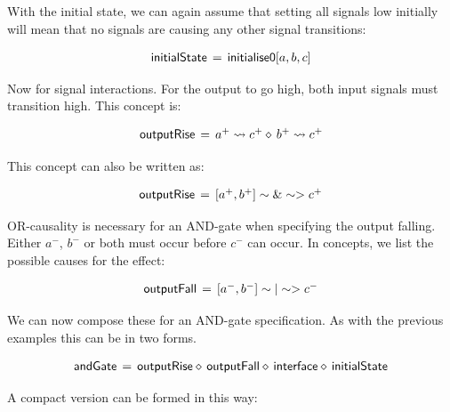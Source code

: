 \documentclass[british, journal]{IEEEtran}
\begin{document}
With the initial state, we can again assume that setting all signals low initially will mean 
that no signals are causing any other signal transitions:

\[
\begin{array}{lcl}
\mathsf{initialState}&\hspace{-2mm}=&\hspace{-2mm}\mathsf{initialise0} [a, b, c]
\end{array}
\]

Now for signal interactions. For the output to go high, both input signals must
transition high. This concept is: 

\[
\begin{array}{lcl}
\mathsf{outputRise}&\hspace{-2mm}=&\hspace{-2mm}a^{+} \rightsquigarrow c^{+} \diamond\, b^{+} \rightsquigarrow c^{+}
\end{array}
\]

This concept can also be written as:

\[
\begin{array}{lcl}
\mathsf{outputRise}&\hspace{-2mm}=&\hspace{-2mm}[a^{+}, b^{+}] \sim\&\sim> c^{+} 
\end{array}
\]

OR-causality is necessary for an AND-gate when specifying the output falling. Either $a^{-}$,
$b^{-}$ or both must occur before $c^{-}$ can occur. In concepts, we list the possible
causes for the effect:

\[
\begin{array}{lcl}
\mathsf{outputFall}&\hspace{-2mm}=&\hspace{-2mm}[a^{-}, b^{-}] \sim|\sim> c^{-} 
\end{array}
\]

We can now compose these for an AND-gate specification. As with the previous examples
this can be in two forms.

\[
\begin{array}{lcl}
\mathsf{andGate}&\hspace{-2mm}=&\hspace{-2mm}\mathsf{outputRise} \diamond\, \mathsf{outputFall} \diamond\, \mathsf{interface} 
\diamond\, \mathsf{initialState}
\end{array}
\]

A compact version can be formed in this way:
\end{document}
